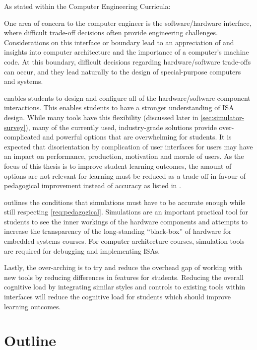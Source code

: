As stated within the Computer Engineering Curricula:
\begin{displayquote}
    One area of concern to the computer engineer is the software/hardware interface, where difficult trade-off decisions often provide engineering challenges. Considerations on this interface or boundary lead to an    appreciation of and insights into computer architecture and the importance of a computer’s machine code. At this boundary, difficult decisions regarding hardware/software trade-offs can occur, and they lead naturally to the design of special-purpose computers and systems.
\end{displayquote}
 enables students to design and configure all of the hardware/software component interactions. This enables students to have a stronger understanding of ISA design. While many tools have this flexibility (discussed later in \cref{sec:simulator-survey}), many of the currently used, industry-grade solutions provide over-complicated and powerful options that are overwhelming for students. It is expected that disorientation by complication of user interfaces for users may have an impact on performance, production, motivation and morale of users\cite{Chalmers2003}. As the focus of this thesis is to improve student learning outcomes, the amount of options are not relevant for learning must be reduced as a trade-off in favour of pedagogical improvement instead of accuracy as listed in . 

 outlines the conditions that simulations must have to be accurate enough while still respecting \cref{req:pedagogical}. Simulations are an important practical tool for students to see the inner workings of the hardware components and attempts to increase the transparency of the long-standing ``black-box'' of hardware for embedded systems courses. For computer architecture courses, simulation tools are required for debugging and implementing ISAs. 

Lastly, the over-arching  is to try and reduce the overhead gap of working with new tools by reducing differences in features for students. Reducing the overall cognitive load by integrating similar styles and controls to existing tools within interfaces will reduce the cognitive load for students which should improve learning outcomes\cite{Chalmers2003, Mavaddat1988}.


\section{Outline} 

